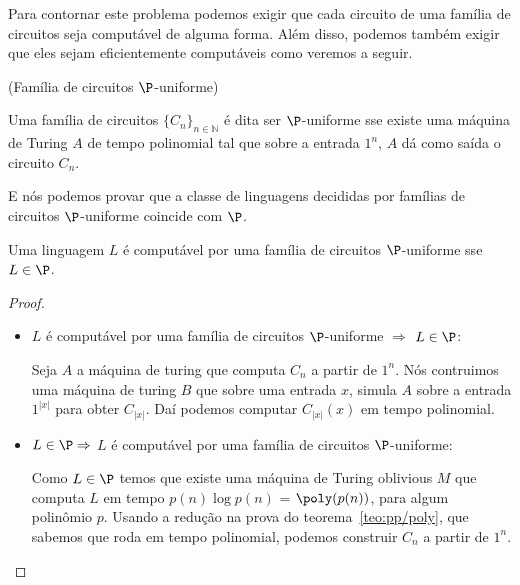 Para contornar este problema podemos exigir que cada circuito de uma família de circuitos seja computável de alguma forma. Além disso, podemos também exigir que eles sejam eficientemente computáveis como veremos a seguir.

\begin{defi} (Família de circuitos $\P$-uniforme)

Uma família de circuitos $\{C_{n}\}_{n \in \mathbb{N}}$ é dita ser $\P$-uniforme sse existe uma máquina de Turing $A$ de tempo polinomial tal que sobre a entrada $1^{n}$, $A$ dá como saída o circuito $C_{n}$.

\end{defi}

E nós podemos provar que a classe de linguagens decididas por famílias de circuitos $\P$-uniforme coincide com $\P$.

\begin{teo} \label{teo:puni}

Uma linguagem $L$ é computável por uma família de circuitos $\P$-uniforme sse $L \in \P$.

\end{teo}

\begin{proof}

\hfill

\begin{itemize}

\item $L$ é computável por uma família de circuitos $\P$-uniforme $\Rightarrow$ $L \in \P$:

    Seja $A$ a máquina de turing que computa $C_{n}$ a partir de $1^{n}$. Nós contruimos uma máquina de turing $B$ que sobre uma entrada $x$, simula $A$ sobre a entrada $1^{\lvert x\rvert}$ para obter $C_{\lvert x\rvert}$. Daí podemos computar $C_{\lvert x\rvert}(x)$ em tempo polinomial. 

\item $L \in \P \Rightarrow$ $L$ é computável por uma família de circuitos $\P$-uniforme:

    Como $L \in \P$ temos que existe uma máquina de Turing oblivious $M$ que computa $L$ em tempo $p(n)\log p(n)$ = $\poly(p(n))$, para algum polinômio $p$. Usando a redução na prova do teorema~\ref{teo:pp/poly}, que sabemos que roda em tempo polinomial, podemos construir $C_{n}$ a partir de $1^{n}$.
 
\end{itemize}

\end{proof}

